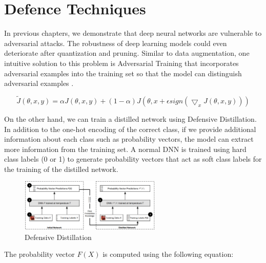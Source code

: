 
\clearpage

\section{Defence Techniques}
\label{sec:defence}

In previous chapters, we demonstrate that deep neural networks are vulnerable to adversarial attacks. The robustness of deep learning models could even deteriorate after quantization and pruning. Similar to data augmentation, one intuitive solution to this problem is Adversarial Training that incorporates adversarial examples into the training set so that the model can distinguish adversarial examples \cite{goodfellow2015explaining}.

$$\tilde{J}(\theta, x, y) = \alpha J(\theta, x, y) + (1-\alpha)J(\theta, x+\epsilon sign(\bigtriangledown_{x}J(\theta, x, y)))$$

On the other hand, we can train a distilled network using Defensive Distillation. In addition to the one-hot encoding of the correct class, if we provide additional information about each class such as probability vectors, the model can extract more information from the training set. A normal DNN is trained using hard class labels (0 or 1) to generate probability vectors that act as soft class labels for the training of the distilled network.

\begin{figure}[H]
\centering
\includegraphics[width=0.6\textwidth]{figures/chapter_defence/defensive_distillation.png}
\caption{Defensive Distillation \cite{papernot2016distillation}}
\label{fig.defensive_distillation}
\end{figure}

The probability vector $F(X)$ is computed using the following equation:

